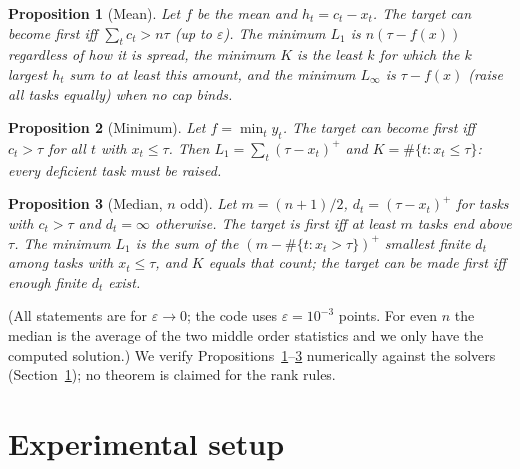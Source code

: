\documentclass{article}
\newtheorem{proposition}{Proposition}
\begin{document}
\begin{proposition}[Mean]\label{prop:mean}
Let $f$ be the mean and $h_t=c_t-x_t$. The target can become first iff $\sum_t c_t> n\tau$ (up to $\varepsilon$). The minimum $L_1$ is $n(\tau-f(x))$ regardless of how it is spread, the minimum $K$ is the least $k$ for which the $k$ largest $h_t$ sum to at least this amount, and the minimum $L_\infty$ is $\tau-f(x)$ (raise all tasks equally) when no cap binds.
\end{proposition}
\begin{proposition}[Minimum]\label{prop:min}
Let $f=\min_t y_t$. The target can become first iff $c_t>\tau$ for all $t$ with $x_t\le\tau$. Then $L_1=\sum_t(\tau-x_t)^+$ and $K=\#\{t:x_t\le\tau\}$: every deficient task must be raised.
\end{proposition}
\begin{proposition}[Median, $n$ odd]\label{prop:median}
Let $m=(n+1)/2$, $d_t=(\tau-x_t)^+$ for tasks with $c_t>\tau$ and $d_t=\infty$ otherwise. The target is first iff at least $m$ tasks end above $\tau$. The minimum $L_1$ is the sum of the $(m-\#\{t:x_t>\tau\})^+$ smallest finite $d_t$ among tasks with $x_t\le\tau$, and $K$ equals that count; the target can be made first iff enough finite $d_t$ exist.
\end{proposition}
(All statements are for $\varepsilon\to0$; the code uses $\varepsilon=10^{-3}$ points. For even $n$ the median is the average of the two middle order statistics and we only have the computed solution.) We verify Propositions~\ref{prop:mean}--\ref{prop:median} numerically against the solvers (Section~\ref{sec:exp}); no theorem is claimed for the rank rules.

\section{Experimental setup}
\label{sec:exp}
\end{document}
